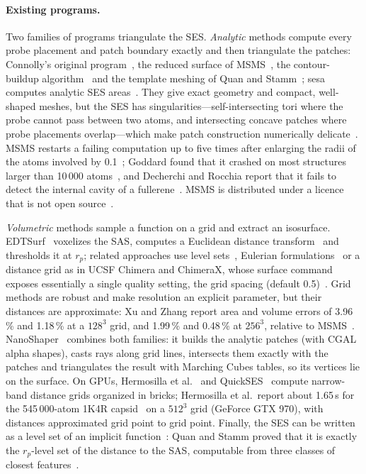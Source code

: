 \paragraph{Existing programs.}
Two families of programs triangulate the SES. \emph{Analytic} methods
compute every probe placement and patch boundary exactly and then
triangulate the patches: Connolly's original program~\cite{connolly1983jac},
the reduced surface of MSMS~\cite{sanner1996}, the contour-buildup
algorithm~\cite{totrov1996,lindow2010} and the template meshing of Quan and
Stamm~\cite{quan2017}; sesa computes analytic SES
areas~\cite{wang2024sesa}. They give exact geometry and compact,
well-shaped meshes, but the SES has singularities---self-intersecting tori
where the probe cannot pass between two atoms, and intersecting concave
patches where probe placements overlap---which make patch construction
numerically delicate~\cite{quan2016}. MSMS restarts a failing computation
up to five times after enlarging the radii of the atoms involved by
0.1\Ang~\cite{msmsmanual}; Goddard found that it crashed on most structures
larger than 10\,000 atoms~\cite{goddard2013}, and Decherchi and Rocchia
report that it fails to detect the internal cavity of a
fullerene~\cite{decherchi2013}. MSMS is distributed under a licence that is
not open source~\cite{msmsmanual}.

\emph{Volumetric} methods sample a function on a grid and extract an
isosurface. EDTSurf~\cite{xu2009edtsurf} voxelizes the SAS, computes a
Euclidean distance transform~\cite{felzenszwalb2012,maurer2003} and
thresholds it at $r_p$; related approaches use level
sets~\cite{can2006lsms}, Eulerian formulations~\cite{liu2017eses} or a
distance grid as in UCSF Chimera and ChimeraX, whose surface command
exposes essentially a single quality setting, the grid spacing
(default 0.5\Ang)~\cite{goddard2013,chimeraxsurface}. Grid methods are
robust and make resolution an explicit parameter, but their distances are
approximate: Xu and Zhang report area and volume errors of 3.96\,\% and
1.18\,\% at a $128^3$ grid, and 1.99\,\% and 0.48\,\% at $256^3$, relative
to MSMS~\cite{xu2009edtsurf}. NanoShaper~\cite{decherchi2013} combines both
families: it builds the analytic patches (with CGAL alpha shapes), casts
rays along grid lines, intersects them exactly with the patches and
triangulates the result with Marching Cubes tables, so its vertices lie on
the surface. On GPUs, Hermosilla et al.~\cite{hermosilla2017} and
QuickSES~\cite{martinez2019quickses} compute narrow-band distance grids
organized in bricks; Hermosilla et al.\ report about 1.65\,s for the
545\,000-atom 1K4R capsid~\cite{pdb1k4r} on a $512^3$ grid (GeForce GTX 970), with
distances approximated grid point to grid point. Finally, the SES can be
written as a level set of an implicit
function~\cite{parulek2012,quan2016}: Quan and Stamm proved that it is
exactly the $r_p$-level set of the distance to the SAS, computable from
three classes of closest features~\cite{quan2016}.

